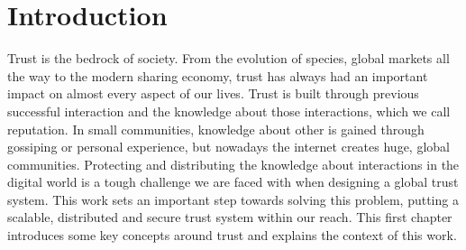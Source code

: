 \chapter{Introduction}
\label{chap:introduction}



Trust is the bedrock of society. From the evolution of species, global markets all the way to the 
modern sharing economy, trust has always had an important impact on almost every aspect of our lives.
Trust is built through previous successful interaction and the knowledge about those interactions,
which we call reputation. In small communities, knowledge about other is gained through gossiping 
or personal experience, but nowadays the internet creates huge, global communities. Protecting and
distributing the knowledge about interactions in the digital world is a tough challenge we are faced
with when designing a global trust system. This work sets an important step towards solving this 
problem, putting a scalable, distributed and secure trust system within our reach. This first chapter 
introduces some key concepts around trust and explains the context of this work.

